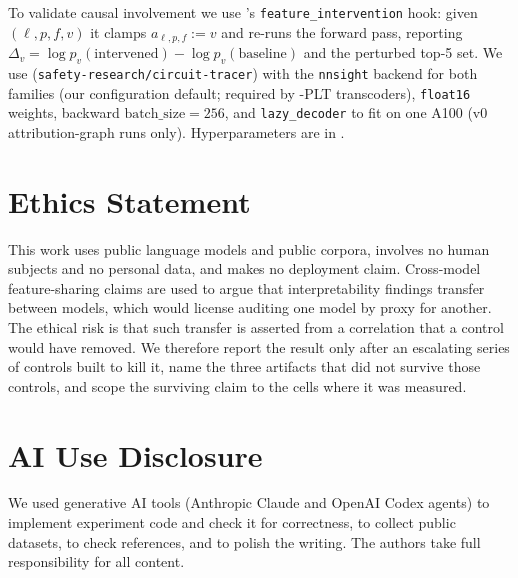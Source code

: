 To validate causal involvement we use \circuittracer{}'s \texttt{feature\_intervention}
hook: given $(\ell,p,f,v)$ it clamps $a_{\ell,p,f}:=v$ and re-runs the forward pass,
reporting $\Delta_v=\log p_v(\text{intervened})-\log p_v(\text{baseline})$ and the perturbed
top-5 set. We use \circuittracer{} (\texttt{safety-research/circuit-tracer}) with the
\texttt{nnsight} backend for both families (our configuration default; required by
\gemma{}-PLT transcoders), \texttt{float16} weights, backward $\text{batch\_size}=256$, and
\texttt{lazy\_decoder} to fit  on one A100 (v0 attribution-graph runs only). Hyperparameters are in
.

\section{Ethics Statement}
This work uses public language models and public corpora, involves no human
subjects and no personal data, and makes no deployment claim. Cross-model
feature-sharing claims are used to argue that interpretability findings transfer
between models, which would license auditing one model by proxy for another. The
ethical risk is that such transfer is asserted from a correlation that a control
would have removed. We therefore report the result only after an escalating
series of controls built to kill it, name the three artifacts that did not
survive those controls, and scope the surviving claim to the cells where it was
measured.

\section{AI Use Disclosure}\label{app:ai}

We used generative AI tools (Anthropic Claude and OpenAI Codex agents) to implement experiment code
and check it for correctness, to collect public datasets, to check references, and to polish the
writing. The authors take full responsibility for all content.
